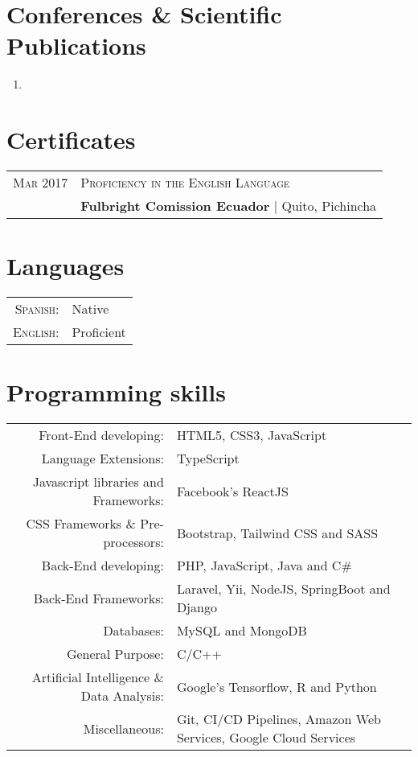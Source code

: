 \documentclass[a4paper,10.9pt]{article}
\begin{document}
\newpage
\section{Conferences \& Scientific Publications}
\begin{enumerate}
	\item {}
\end{enumerate}

\section{Certificates}
\begin{tabular}{r|l}	
 \textsc{Mar} 2017 &  \textsc{Proficiency in the English Language}\\&
 \textbf{Fulbright Comission Ecuador} | Quito, Pichincha\\

\end{tabular}

\section{Languages}
\begin{tabular}{rl}
 \textsc{Spanish:}&Native\\
\textsc{English:}&Proficient\\
\end{tabular}

\section{Programming skills}
\begin{tabular}{rl}
 Front-End developing:& HTML5, CSS3, JavaScript\\
 Language Extensions:& TypeScript\\
 Javascript libraries and Frameworks:& Facebook's ReactJS\\
 CSS Frameworks \& Pre-processors:& Bootstrap, Tailwind CSS and SASS\\
 Back-End developing:& PHP, JavaScript, Java and C\#\\
 Back-End Frameworks:& Laravel, Yii, NodeJS, SpringBoot and Django\\
 Databases:& MySQL and MongoDB\\
 General Purpose:& C/C++\\
 Artificial Intelligence \& Data Analysis:& Google's Tensorflow, R and Python\\
Miscellaneous:& Git, CI/CD Pipelines, Amazon Web Services, Google Cloud Services
\end{tabular}
\end{document}
